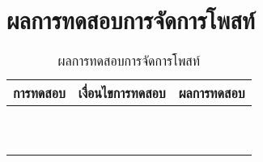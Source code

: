 \section{ผลการทดสอบการจัดการโพสท์}
\begin{table}[H]
	\caption{ผลการทดสอบการจัดการโพสท์}
    \centering	
	\label{tab:test5}
    \begin{tabular}{ | p{4cm} | p{4cm} | p{4cm}  | }
		\hline
	\multicolumn{1}{|c|}{การทดสอบ} & \multicolumn{1}{c|}{เงื่อนไขการทดสอบ} & \multicolumn{1}{c|}{ผลการทดสอบ}   \\ \hline
	\setstretch{1.0}{ทดสอบการสร้างโพสท์}
	& \setstretch{1.0}{ผู้ใช้กดโพสท์โดยไม่ระบุข้อความ}
	& \setstretch{1.0}{ระบบจะแสดงข้อความ  กรุณาระบุข้อความให้ถูกต้อง  }  \\ \cline{2-3} 
	& \setstretch{1.0}{ผู้ใช้โพสท์โดยกรอกข้อความ และไม่เพิ่มรูปภาพ} 
	& \setstretch{1.0}{ระบบจะบันทึกข้อมูลเฉพาะข้อความ} \\ \cline{2-3} 
	& \setstretch{1.0}{ผู้ใช้โพสท์โดยกรอกข้อความ และเพิ่มรูปภาพ} 
	& \setstretch{1.0}{ระบบจะบันทึกข้อมูลข้อความและรูปภาพ} \\ \cline{2-3} 
	& \setstretch{1.0}{ผู้ใช้โพสท์โดยไม่เลือกประเภท} 
	& \setstretch{1.0}{ระบบจะแสดงข้อความ  กรุณาเลือกประเภท } \\ \hline
	\setstretch{1.0}{ทดสอบการแก้ไขโพสท์}
	& \setstretch{1.0}{ผู้ใช้เลือกปุ่มแก้ไขโพสท์}
	& \setstretch{1.0}{ระบบจะแสดงหน้าแก้ไขโพสท์ }  \\ \cline{2-3} 
	& \setstretch{1.0}{ผู้ใช้ไม่ได้แก้ไขข้อความโพสท์}
	& \setstretch{1.0}{ระบบจะกลับไปหน้ากระดานข่าว } \\ \cline{2-3} 
	& \setstretch{1.0}{ผู้ใช้แก้ไขข้อความโพสท์}
	& \setstretch{1.0}{ระบบจะกลับไปหน้ากระดานข่าว และบันทึกข้อมูลลงฐานข้อมูล } \\ \hline
	\setstretch{1.0}{ทดสอบการลบโพสท์}
	& \setstretch{1.0}{ผู้ใช้เลือกปุ่มลบโพสท์}
	& \setstretch{1.0}{ระบบจะแสดงตัวเลือกได้แก่ ยืนยันการลบ และกลับ }  \\ \cline{2-3} 
	& \setstretch{1.0}{ผู้ใช้เลือกยืนยันการลบโพสท์}
	& \setstretch{1.0}{ระบบจะทำการลบโพสท์ } \\ \cline{2-3} 
	& \setstretch{1.0}{ผู้ใช้เลือกกลับ}
	& \setstretch{1.0}{ระบบจะกลับไปยังหน้ากระดานข่าว } \\ \hline
    \end{tabular}
\end{table}

